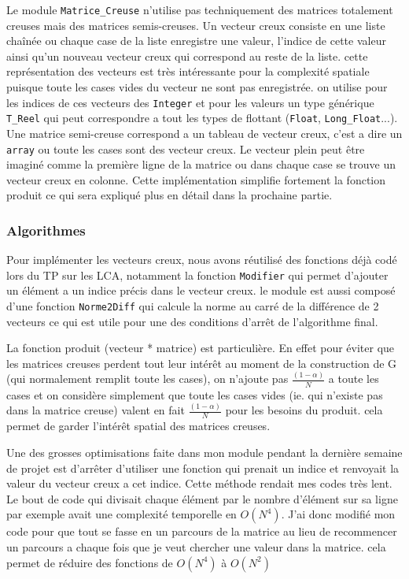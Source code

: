 \documentclass{article}
\begin{document}
Le module \texttt{Matrice\_Creuse} n'utilise pas techniquement des matrices totalement creuses mais des matrices semis-creuses. Un vecteur creux consiste en une liste chaînée ou chaque case de la liste enregistre une valeur, l'indice de cette valeur  ainsi qu'un nouveau vecteur creux qui correspond au reste de la liste. cette représentation des vecteurs est très intéressante pour la complexité spatiale puisque toute les cases vides du vecteur ne sont pas enregistrée. on utilise pour les indices de ces vecteurs des \texttt{Integer} et pour les valeurs un type générique \texttt{T\_Reel} qui peut correspondre a tout les types de flottant (\texttt{Float}, \texttt{Long\_Float}...). Une matrice semi-creuse correspond a un tableau de vecteur creux, c'est a dire un \texttt{array} ou toute les cases sont des vecteur creux. Le vecteur plein peut être imaginé comme la première ligne de la matrice ou dans chaque case se trouve un vecteur creux en colonne. Cette implémentation simplifie fortement la fonction produit ce qui sera expliqué plus en détail dans la prochaine partie.

\subsubsection{Algorithmes}

Pour implémenter les vecteurs creux, nous avons réutilisé des fonctions déjà codé lors du TP sur les LCA, notamment la fonction \texttt{Modifier} qui permet d'ajouter un élément a un indice précis dans le vecteur creux. le module est aussi composé d'une fonction \texttt{Norme2Diff} qui calcule la norme au carré de la différence de 2 vecteurs ce qui est utile pour une des conditions d'arrêt de l'algorithme final.

La fonction produit (vecteur * matrice)  est particulière. En effet pour éviter que les matrices creuses perdent tout leur intérêt au moment de la construction de G (qui normalement remplit toute les cases), on n'ajoute pas $\frac{(1-\alpha)}{N}$ a toute les cases et on considère simplement que toute les cases vides (ie. qui n'existe pas dans la matrice creuse) valent en fait $\frac{(1-\alpha)}{N}$ pour les besoins du produit. cela permet de garder l'intérêt spatial des matrices creuses.

Une des grosses optimisations faite dans mon module pendant la dernière semaine de projet est d'arrêter d'utiliser une fonction qui prenait un indice et renvoyait la valeur du vecteur creux a cet indice. Cette méthode rendait mes codes très lent. Le bout de code qui divisait chaque élément par le nombre d'élément sur sa ligne par exemple avait une complexité temporelle en $O(N^4)$. J'ai donc modifié mon code pour que tout se fasse en un parcours de la matrice au lieu de recommencer un parcours a chaque fois que je veut chercher une valeur dans la matrice. cela permet de réduire des fonctions de $O(N^4)$ à $O(N^2)$
\end{document}
